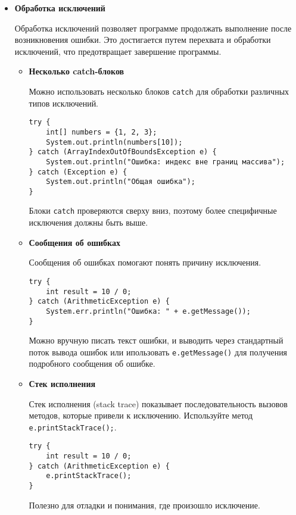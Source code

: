\begin{itemize}
    \item \textbf{Обработка исключений} \par
    Обработка исключений позволяет программе продолжать выполнение после возникновения ошибки. Это достигается путем перехвата и обработки исключений, что предотвращает завершение программы.
    
    \begin{itemize}
        \item \textbf{Несколько catch-блоков} \par
        Можно использовать несколько блоков \texttt{catch} для обработки различных типов исключений.
        \begin{verbatim}
try {
    int[] numbers = {1, 2, 3};
    System.out.println(numbers[10]);
} catch (ArrayIndexOutOfBoundsException e) {
    System.out.println("Ошибка: индекс вне границ массива");
} catch (Exception e) {
    System.out.println("Общая ошибка");
}
        \end{verbatim}
        Блоки \texttt{catch} проверяются сверху вниз, поэтому более специфичные исключения должны быть выше.

        \item \textbf{Сообщения об ошибках} \par
        Сообщения об ошибках помогают понять причину исключения.
        \begin{verbatim}
try {
    int result = 10 / 0;
} catch (ArithmeticException e) {
    System.err.println("Ошибка: " + e.getMessage());
}
        \end{verbatim}
        Можно вручную писать текст ошибки, и выводить через стандартный поток вывода ошибок или ипользовать \texttt{e.getMessage()} для получения подробного сообщения об ошибке.

        \item \textbf{Стек исполнения} \par
        Стек исполнения (stack trace) показывает последовательность вызовов методов, которые привели к исключению. Используйте метод \texttt{e.printStackTrace();}.
        \begin{verbatim}
try {
    int result = 10 / 0;
} catch (ArithmeticException e) {
    e.printStackTrace();
}
        \end{verbatim}
        Полезно для отладки и понимания, где произошло исключение.
    \end{itemize}
\end{itemize}

